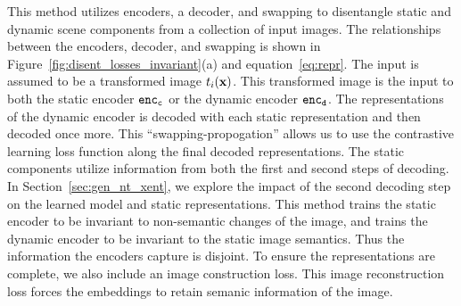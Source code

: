 \documentclass[11pt]{article}
\begin{document}
This method utilizes encoders, a decoder, and swapping to disentangle static and dynamic scene components from a collection of input images. The relationships between the encoders, decoder, and swapping is shown in Figure~\ref{fig:disent_losses_invariant}(a) and equation~\ref{eq:repr}. The input is assumed to be a transformed image $t_i(\boldsymbol{\mathrm{x}})$. This transformed image is the input to both the static encoder ${\tt enc_{c}}$ or the dynamic encoder ${\tt enc_{d}}$. The representations of the dynamic encoder is decoded with each static representation and then decoded once more. This ``swapping-propogation'' allows us to use the contrastive learning loss function along the final decoded representations. The static components utilize information from both the first and second steps of decoding. In Section~\ref{sec:gen_nt_xent}, we explore the impact of the second decoding step on the learned model and static representations. This method trains the static encoder to be invariant to non-semantic changes of the image, and trains the dynamic encoder to be invariant to the static image semantics. Thus the information the encoders capture is disjoint. To ensure the representations are complete, we also include an image construction loss. This image reconstruction loss forces the embeddings to retain semanic information of the image.
\end{document}
